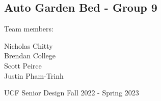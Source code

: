 \begin{titlepage}
    \begin{center}
        \section*{Auto Garden Bed - Group 9}
        \begin{Large}
            Team members:\\
            \vspace{.5cm}
        \end{Large}
        \begin{large}
            Nicholas Chitty \\
            Brendan College \\
            Scott Peirce \\
            Justin Pham-Trinh \\
        \end{large}
        \vfill
        UCF Senior Design Fall 2022 - Spring 2023

        \pagebreak
    \end{center}
\end{titlepage}